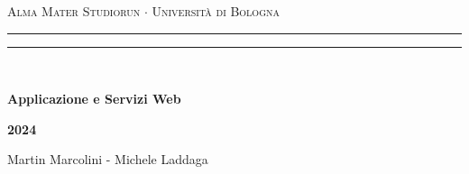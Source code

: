 \begin{titlepage}
    \begin{center}
        {{\Large{\textsc{Alma Mater Studiorun $\cdot$ Università di Bologna}}}}
        \rule[0.1cm]{15.8cm}{0.1mm}
        \rule[0.5cm]{15.8cm}{0.6mm}
        \\
        \vspace{3mm}
    \end{center}
    \vspace{2mm}
    \begin{center}
        {\Huge{\bf{Applicazione e Servizi Web}}}
        \vspace{10mm} \par \noindent
        {\LARGE \textbf{2024}}
        \vspace{15mm} \par \noindent
        {\Large Martin Marcolini - Michele Laddaga}
    \end{center}
    \hfill
    \vspace{40mm}
\end{titlepage}
